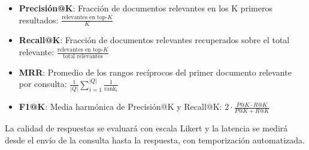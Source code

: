 \documentclass[11pt, a4paper]{article}
\begin{document}
\begin{itemize}
    \item \textbf{Precisión@K}: Fracción de documentos relevantes en los K primeros resultados: $\frac{\text{relevantes en top-}K}{K}$
    \item \textbf{Recall@K}: Fracción de documentos relevantes recuperados sobre el total relevante: $\frac{\text{relevantes en top-}K}{\text{total relevantes}}$
    \item \textbf{MRR}: Promedio de los rangos recíprocos del primer documento relevante por consulta: $\frac{1}{|Q|} \sum_{i=1}^{|Q|} \frac{1}{\text{rank}_i}$
    \item \textbf{F1@K}: Media harmónica de Precisión@K y Recall@K: $2 \cdot \frac{P@K \cdot R@K}{P@K + R@K}$
\end{itemize}

La calidad de respuestas se evaluará con escala Likert y la latencia se medirá desde el envío de la consulta hasta la respuesta, con temporización automatizada.

\printbibliography[title={Referencias}]
\end{document}
